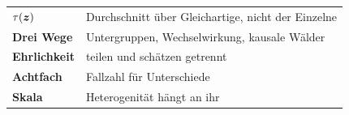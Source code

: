 \begin{merksatz}
\begin{center}
\renewcommand{\arraystretch}{1.5}
\begin{tabular}{@{}P{3.0cm}P{5.6cm}@{}}
\toprule
\textbf{$\tau(\boldsymbol{z})$} & Durchschnitt über Gleichartige, nicht der Einzelne\\
\textbf{Drei Wege} & Untergruppen, Wechselwirkung, kausale Wälder\\
\textbf{Ehrlichkeit} & teilen und schätzen getrennt\\
\textbf{Achtfach} & Fallzahl für Unterschiede\\
\textbf{Skala} & Heterogenität hängt an ihr\\
\bottomrule
\end{tabular}
\end{center}

\begin{center}
\begin{minipage}{0.88\textwidth}
\end{minipage}
\end{center}
\end{merksatz}
